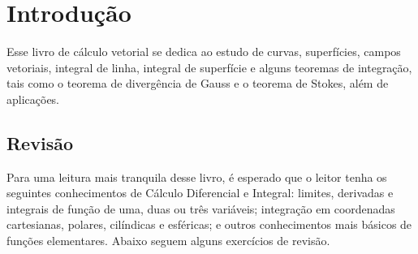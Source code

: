 
\chapter{Introdução}\label{chap:introducao}

Esse livro de cálculo vetorial se dedica ao estudo de curvas, superfícies, campos vetoriais, integral de linha, integral de superfície e alguns teoremas de integração, tais como o teorema de divergência de Gauss e o teorema de Stokes, além de aplicações.

\section{Revisão}
Para uma leitura mais tranquila desse livro, é esperado que o leitor tenha os seguintes conhecimentos de Cálculo Diferencial e Integral: limites, derivadas e integrais de função de uma, duas ou três variáveis; integração em coordenadas cartesianas, polares, cilíndicas e esféricas; e outros conhecimentos mais básicos de funções elementares. Abaixo seguem alguns exercícios de revisão.

